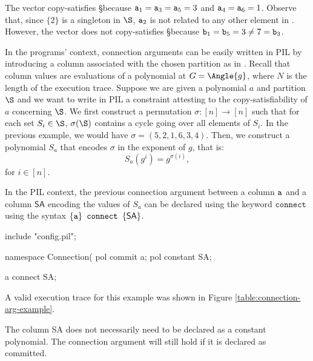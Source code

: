 The vector \att copy-satisfies \S because $\mathtt{a}_1 = \mathtt{a}_3 = \mathtt{a}_5 = 3$ and $\mathtt{a}_4 = \mathtt{a}_6 = 1$. Observe that, since $\{2\}$ is a singleton in $\S$, $\mathtt{a}_2$ is not related to any other element in \att. 
However, the vector \btt does not copy-satisfies \S because $\mathtt{b}_1 = \mathtt{b}_5 = 3 \neq 7 = \mathtt{b}_3$.

In the programs' context, connection arguments can be easily written in PIL by introducing a column associated with the chosen partition as in \cite{EPRINT:GabWilCio19}. Recall that column values are evaluations of a polynomial at $G = \Angle{g}$, where $N$ is the length of the execution trace. Suppose we are given a polynomial $a$ and partition $\S$ and we want to write in PIL a constraint attesting to the copy-satisfiability of $a$ concerning $\S$. We first construct a permutation $\sigma \colon [n] \to [n]$ such that for each set $S_i \in \S$, $\sigma(\S)$ contains a cycle going over all elements of $S_i$. In the previous example, we would have $\sigma = (5,2,1,6,3,4)$. Then, we construct a polynomial $S_a$ that encodes $\sigma$ in the exponent of $g$, that is:
\[
S_a(g^i) = g^{\sigma(i)},
\]
for $i \in [n]$.

In the PIL context, the previous connection argument between a column $\mathtt{a}$ and a column $\textsf{SA}$ encoding the values of $S_a$ can be declared using the keyword $\texttt{connect}$ using the syntax $\{\mathtt{a}\} \texttt{ connect } \{\textsf{SA}\}$. 
\begin{pil}
    include "config.pil";
    
    namespace Connection(%
    pol commit a;
    pol constant SA;
    
    {a} connect {SA};
\end{pil}
A valid execution trace for this example was shown in Figure \ref{table:connection-arg-example}.

\begin{remark}
    The column \textsf{SA} does not necessarily need to be declared as a constant polynomial. The connection argument will still hold if it is declared as committed.
\end{remark}

